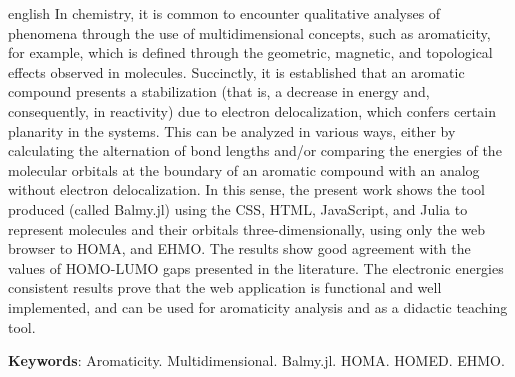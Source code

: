 \begin{resumo}[Abstract]
	\SingleSpacing
	\begin{otherlanguage*}{english}
In chemistry, it is common to encounter qualitative analyses of phenomena through the use of multidimensional concepts, such as aromaticity, for example, which is defined through the geometric, magnetic, and topological effects observed in molecules. Succinctly, it is established that an aromatic compound presents a stabilization (that is, a decrease in energy and, consequently, in reactivity) due to electron delocalization, which confers certain planarity in the systems. This can be analyzed in various ways, either by calculating the alternation of bond lengths and/or comparing the energies of the molecular orbitals at the boundary of an aromatic compound with an analog without electron delocalization. In this sense, the present work shows the tool produced (called Balmy.jl) using the \gls{CSS}, \gls{HTML}, JavaScript, and Julia to represent molecules and their orbitals three-dimensionally, using only the web browser to \gls{HOMA}, and \gls{EHMO}. The results show good agreement with the values of \gls{HOMO}-\gls{LUMO} gaps presented in the literature. The electronic energies consistent results prove that the web application is functional and well implemented, and can be used for aromaticity analysis and as a didactic teaching tool.
		
		\textbf{Keywords}: Aromaticity. Multidimensional. Balmy.jl. \gls{HOMA}. \gls{HOMED}. \gls{EHMO}.
	\end{otherlanguage*}
\end{resumo}

% 
%
%  

